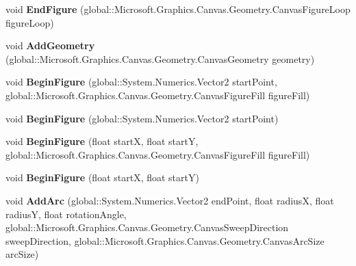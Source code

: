 \begin{DoxyCompactItemize}
void {\bfseries End\+Figure} (global\+::\+Microsoft.\+Graphics.\+Canvas.\+Geometry.\+Canvas\+Figure\+Loop figure\+Loop)
\item 
\mbox{\label{interface_microsoft_1_1_graphics_1_1_canvas_1_1_geometry_1_1_i_canvas_path_builder_aa46920a62d2d31a461ff0078c07432cf}} 
void {\bfseries Add\+Geometry} (global\+::\+Microsoft.\+Graphics.\+Canvas.\+Geometry.\+Canvas\+Geometry geometry)
\item 
\mbox{\label{interface_microsoft_1_1_graphics_1_1_canvas_1_1_geometry_1_1_i_canvas_path_builder_afe2a6e4649d8c29aaa44335cebe61dc5}} 
void {\bfseries Begin\+Figure} (global\+::\+System.\+Numerics.\+Vector2 start\+Point, global\+::\+Microsoft.\+Graphics.\+Canvas.\+Geometry.\+Canvas\+Figure\+Fill figure\+Fill)
\item 
\mbox{\label{interface_microsoft_1_1_graphics_1_1_canvas_1_1_geometry_1_1_i_canvas_path_builder_aa01f534a0d57d542b6e74f2939e13d54}} 
void {\bfseries Begin\+Figure} (global\+::\+System.\+Numerics.\+Vector2 start\+Point)
\item 
\mbox{\label{interface_microsoft_1_1_graphics_1_1_canvas_1_1_geometry_1_1_i_canvas_path_builder_ab65fd089f5c2a5bdb2e36fe9c552044a}} 
void {\bfseries Begin\+Figure} (float startX, float startY, global\+::\+Microsoft.\+Graphics.\+Canvas.\+Geometry.\+Canvas\+Figure\+Fill figure\+Fill)
\item 
\mbox{\label{interface_microsoft_1_1_graphics_1_1_canvas_1_1_geometry_1_1_i_canvas_path_builder_acbe72d48edf4e1066adf59e9f7057323}} 
void {\bfseries Begin\+Figure} (float startX, float startY)
\item 
\mbox{\label{interface_microsoft_1_1_graphics_1_1_canvas_1_1_geometry_1_1_i_canvas_path_builder_aeb2d7c2ee7825de333cf7adbdc0901c8}} 
void {\bfseries Add\+Arc} (global\+::\+System.\+Numerics.\+Vector2 end\+Point, float radiusX, float radiusY, float rotation\+Angle, global\+::\+Microsoft.\+Graphics.\+Canvas.\+Geometry.\+Canvas\+Sweep\+Direction sweep\+Direction, global\+::\+Microsoft.\+Graphics.\+Canvas.\+Geometry.\+Canvas\+Arc\+Size arc\+Size)

\end{DoxyCompactItemize}
